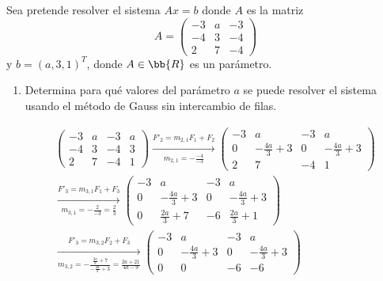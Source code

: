 \begin{ejercicio}
    Sea pretende resolver el sistema $Ax=b$ donde $A$ es la matriz
    $$A=\left( \begin{array}{ccc}
        -3 & a & -3 \\
         -4 & 3 & -4 \\
         2 & 7 & -4
    \end{array}\right)$$
    y $b=(a,3,1)^T$, donde $A\in \bb{R}$ es un parámetro.

    \begin{enumerate}
        \item Determina para qué valores del parámetro $a$ se puede resolver el sistema usando el método de Gauss sin intercambio de filas.

        \begin{multline*}
        \left(\begin{array}{ccc|c}
            -3 & a & -3 & a\\
             -4 & 3 & -4  & 3\\
             2 & 7 & -4 & 1
        \end{array}
        \right) \xrightarrow[m_{2,1}=-\frac{-4}{-3}]{F'_2=m_{2,1}F_1 + F_2}
        \left(\begin{array}{ccc|c}
            -3 & a & -3 & a\\
             0 & -\frac{4a}{3}+3 & 0 & -\frac{4a}{3}+3\\
             2 & 7 & -4 & 1
        \end{array}
        \right) \\
        \xrightarrow[m_{3,1}=-\frac{2}{-3} = \frac{2}{3}]{F'_3=m_{3,1}F_1 + F_3}
        \left(\begin{array}{ccc|c}
            -3 & a & -3 & a\\
             0 & -\frac{4a}{3}+3 & 0 & -\frac{4a}{3}+3\\
             0 & \frac{2a}{3}+7 & -6 & \frac{2a}{3}+1
        \end{array}
        \right) \\
        \xrightarrow[m_{3,2}=-\frac{\frac{2a}{3}+7}{-\frac{4a}{3}+3} = \frac{2a+21}{4a-9}]{F'_3=m_{3,2}F_2 + F_3}
        \left(\begin{array}{ccc|c}
            -3 & a & -3 & a\\
             0 & -\frac{4a}{3}+3 & 0 & -\frac{4a}{3}+3\\
             0 & 0 & -6 & -6
        \end{array}
        \right) 
    \end{multline*}


\end{enumerate}
\end{ejercicio}
